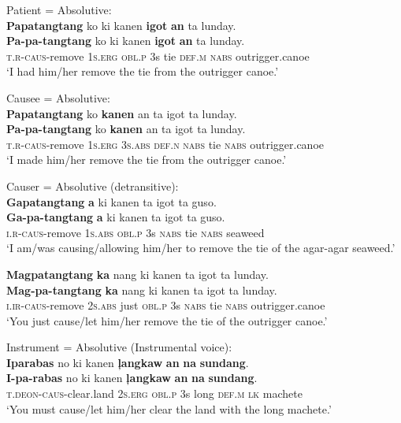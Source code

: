 \ea
Patient = Absolutive: \\
\textbf{Papatangtang}  ko  ki  kanen  \textbf{igot}  \textbf{an}  ta  lunday. \\\smallskip
\gll \textbf{Pa-pa-tangtang}  ko  ki  kanen  \textbf{igot}  \textbf{an}  ta  lunday. \\
\textsc{t.r}-\textsc{caus}-remove  1\textsc{s.erg}  \textsc{obl.p}  3s  tie  \textsc{def.m}  \textsc{nabs}  outrigger.canoe \\
\glt ‘I had him/her remove the tie from the outrigger canoe.’
\z

\ea
Causee = Absolutive: \\
\textbf{Papatangtang}  ko  \textbf{kanen}  an  ta  igot  ta  lunday. \\\smallskip
\gll \textbf{Pa-pa-tangtang}  ko  \textbf{kanen}  an  ta  igot  ta  lunday. \\
\textsc{t.r}-\textsc{caus}-remove  1\textsc{s.erg}  3\textsc{s.abs}  \textsc{def.n}  \textsc{nabs}  tie  \textsc{nabs}  outrigger.canoe \\
\glt ‘I made him/her remove the tie from the outrigger canoe.’
\z

\ea
Causer = Absolutive (detransitive): \\
\textbf{Gapatangtang}  \textbf{a}  ki  kanen  ta  igot  ta  guso. \\\smallskip
\gll \textbf{Ga-pa-tangtang}  \textbf{a}  ki  kanen  ta  igot  ta  guso. \\
\textsc{i.r}-\textsc{caus}-remove  1\textsc{s.abs}  \textsc{obl.p}  3s  \textsc{nabs}  tie  \textsc{nabs}  seaweed \\
\glt `I am/was causing/allowing him/her to remove the tie of the agar-agar seaweed.’
\z

\ea
\textbf{Magpatangtang}  \textbf{ka}  nang  ki  kanen  ta  igot  ta  lunday. \\\smallskip
\gll \textbf{Mag-pa-tangtang}  \textbf{ka}  nang  ki  kanen  ta  igot  ta  lunday. \\
\textsc{i.ir}-\textsc{caus}-remove  2\textsc{s.abs}  just  \textsc{obl.p}  3s  \textsc{nabs}  tie  \textsc{nabs}  outrigger.canoe \\
\glt ‘You just cause/let him/her remove the tie of the outrigger canoe.’
\z



\ea
Instrument = Absolutive (Instrumental voice): \\
\textbf{Iparabas}  no  ki  kanen  \textbf{ļangkaw}  \textbf{an}  \textbf{na} \textbf{sundang}. \\\smallskip
\gll \textbf{I-pa-rabas}  no  ki  kanen  \textbf{ļangkaw}  \textbf{an}  \textbf{na} \textbf{sundang}. \\
\textsc{t.deon}-\textsc{caus}-clear.land  2\textsc{s.erg}  \textsc{obl.p}  3s  long  \textsc{def.m}  \textsc{lk}  machete \\
\glt ‘You must cause/let him/her clear the land with the long machete.’
\z

